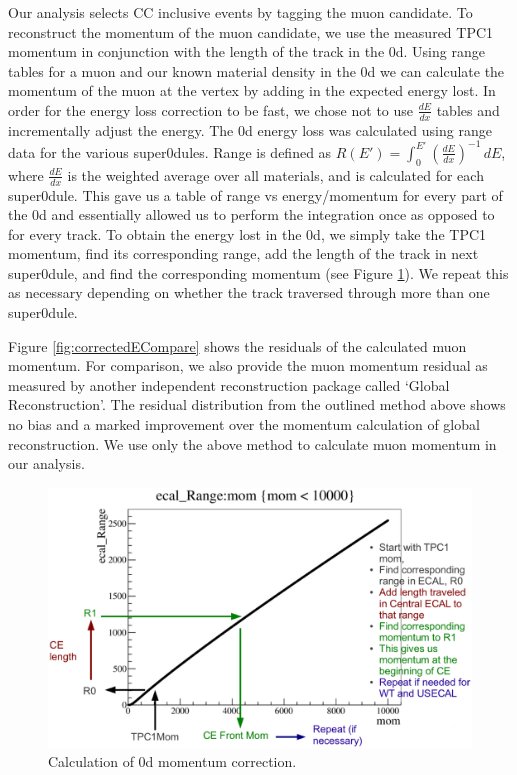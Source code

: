 Our analysis selects CC inclusive events by tagging the muon candidate. To reconstruct the momentum of the muon candidate, we use the measured TPC1 momentum in conjunction with the length of the track in the \p0d. Using range tables for a muon and our known material density in the \p0d we can calculate the momentum of the muon at the vertex by adding in the expected energy lost. In order for the energy loss correction to be fast, we chose not to use 
$\frac{dE}{dx}$ tables and incrementally adjust the energy. The \p0d energy loss was calculated using range data for the various super\p0dules.
Range is defined as $R(E')=\int^{E'}_0 \left(\frac{dE}{dx}\right)^{-1}\,dE$, where
$\frac{dE}{dx}$ is the weighted average over all materials, and is calculated for each super\p0dule.  
This gave us a table of range vs energy/momentum for every part of the \p0d and 
essentially allowed us to perform the integration once as opposed to for every track.
To obtain the energy lost in the \p0d, we simply take the TPC1 momentum, find its 
corresponding range, add the length of the track in next super\p0dule, and find
the corresponding momentum (see Figure \ref{fig:energyCorr}).  We repeat this as 
necessary depending on whether the track traversed through more than one super\p0dule.

Figure \ref{fig:correctedECompare} shows the residuals of the calculated muon momentum. For comparison, we also provide the muon momentum residual as measured by another independent reconstruction package called `Global Reconstruction'. The residual distribution from the outlined method above shows no bias and a marked improvement over the momentum calculation of global reconstruction. We use only the above method to calculate muon momentum in our analysis.

\begin{figure}
\centering
\includegraphics[width=5.5in]{Figures/eLossCalc1.eps}
\caption{Calculation of \p0d momentum correction.} 
\label{fig:energyCorr}
\end{figure}

